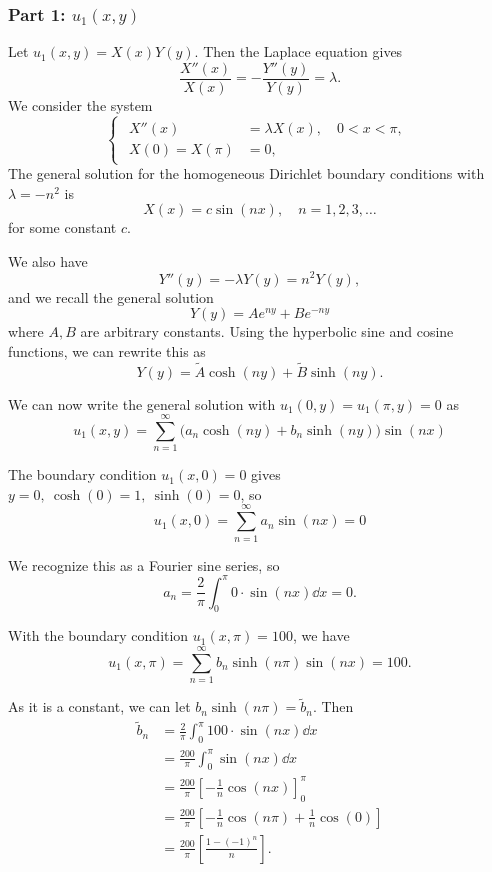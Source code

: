 \documentclass[plain]{pset}
\begin{document}
\begin{solution}
    \subsubsection*{Part 1: \(u_1(x, y)\)}
    Let \(u_1(x, y) = X(x)Y(y)\). Then the Laplace equation gives
    \[\frac{X''(x)}{X(x)} = -\frac{Y''(y)}{Y(y)} = \lambda.\]
    We consider the system
    \[
        \begin{cases}
            \begin{aligned}
                X''(x)        & = \lambda X(x), \quad 0 < x < \pi, \\
                X(0) = X(\pi) & = 0,
            \end{aligned}
        \end{cases}
    \]
    The general solution for the homogeneous Dirichlet boundary conditions with \(\lambda = -n^2\) is
    \[X(x) = c\sin(nx), \quad n = 1, 2, 3, \ldots\]
    for some constant \(c\).

    We also have
    \[Y''(y) = -\lambda Y(y) = n^2 Y(y),\]
    and we recall the general solution
    \[Y(y) = Ae^{ny} + Be^{-ny}\]
    where \(A, B\) are arbitrary constants. Using the hyperbolic sine and cosine functions, we can rewrite this as
    \[Y(y) = \tilde{A}\cosh(ny) + \tilde{B}\sinh(ny).\]

    We can now write the general solution with \(u_1(0, y) = u_1(\pi, y) = 0\) as
    \[u_1(x, y) = \sum_{n=1}^\infty \bigl(a_n \cosh(ny) + b_n \sinh(ny)\bigr)\sin(nx)\]

    The boundary condition \(u_1(x, 0) = 0\) gives \(y = 0, \ \cosh(0) = 1, \ \sinh(0) = 0\), so
    \[u_1(x, 0) = \sum_{n=1}^\infty a_n \sin(nx) = 0\]

    We recognize this as a Fourier sine series, so
    \[a_n = \frac{2}{\pi} \int_0^\pi 0 \cdot \sin(nx) \dd x = 0.\]

    With the boundary condition \(u_1(x, \pi) = 100\), we have
    \[u_1(x, \pi) = \sum_{n=1}^\infty b_n \sinh(n\pi)\sin(nx) = 100.\]

    As it is a constant, we can let \(b_n \sinh(n\pi) = \tilde{b}_n\). Then
    \begin{align*}
        \tilde{b}_n & = \frac{2}{\pi} \int_0^\pi 100 \cdot \sin(nx) \dd x                        \\
                    & = \frac{200}{\pi} \int_0^\pi \sin(nx) \dd x                                \\
                    & = \frac{200}{\pi} \left[-\frac{1}{n}\cos(nx)\right]_0^\pi                  \\
                    & = \frac{200}{\pi} \left[-\frac{1}{n}\cos(n\pi) + \frac{1}{n}\cos(0)\right] \\
                    & = \frac{200}{\pi} \left[\frac{1 - (-1)^n}{n}\right].
    \end{align*}


\end{solution}
\end{document}
